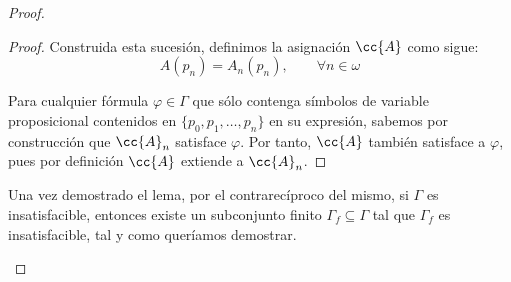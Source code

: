 \documentclass[12pt]{article}
\begin{document}
\begin{ejercicio}
\begin{proof}
\begin{description}
\begin{lema}
\begin{proof}
                        Construida esta sucesión, definimos la asignación $\cc{A}$ como sigue:
                        \begin{equation*}
                            A(p_n) = A_n(p_n), \qquad \forall n\in \omega
                        \end{equation*}
                        
                        Para cualquier fórmula $\varphi\in \Gamma$ que sólo contenga símbolos de variable proposicional contenidos en $\{p_0, p_1, \dots, p_n\}$ en su expresión,
                        sabemos por construcción que $\cc{A}_n$ satisface $\varphi$. Por tanto, $\cc{A}$ también satisface a $\varphi$,
                        pues por definición $\cc{A}$ extiende a $\cc{A}_n$.
                    \end{proof}
                \end{lema}

                Una vez demostrado el lema, por el contrarecíproco del mismo, si $\Gamma$ es insatisfacible, entonces existe un subconjunto finito $\Gamma_f\subseteq \Gamma$ tal que $\Gamma_f$ es insatisfacible, tal y como queríamos demostrar.
            \end{description}
        \end{proof}
    \end{ejercicio}
\end{document}
